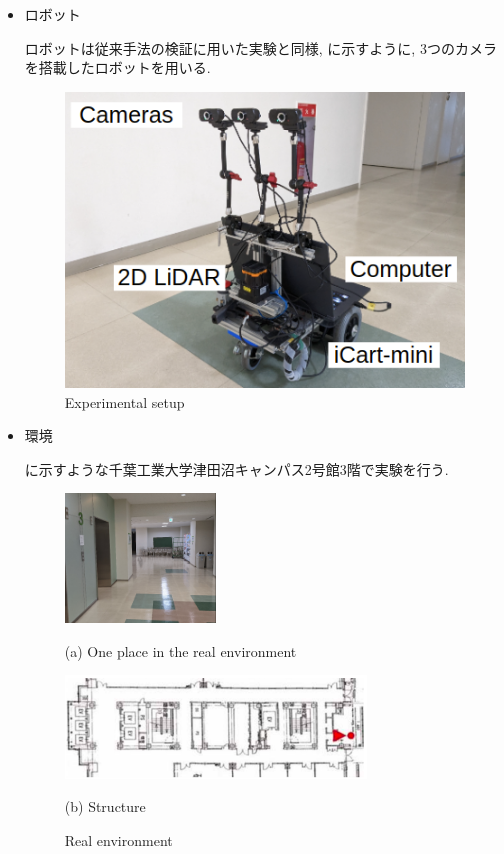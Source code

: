 \begin{itemize}
  \item ロボット
  
  ロボットは従来手法の検証に用いた実験\cite{okada1}と同様, に示すように, 3つのカメラを搭載したロボットを用いる.

  
  \begin{figure}[hbtp]
    \centering
   \includegraphics[keepaspectratio, scale=0.6]
        {images/gamma3.png}
   \caption{Experimental setup}
   \label{Fig:gamma}
  \end{figure}

  \newpage

  \item 環境

  に示すような千葉工業大学津田沼キャンパス2号館3階で実験を行う.

  \begin{figure}[h]
    \centering
    \begin{minipage}[b]{120mm}
      \centering
      \includegraphics[width=40mm]{images/real.png}
      \caption*{(a) One place in the real environment}
    \end{minipage} 
    \begin{minipage}[b]{120mm}
      \centering
      \includegraphics[width=80mm]{images/tsudanuma_structure.png}
      \caption*{(b) Structure}
    \end{minipage}
    \caption{Real environment}
    \label{Fig:real_environment}
  \end{figure}
\end{itemize}


